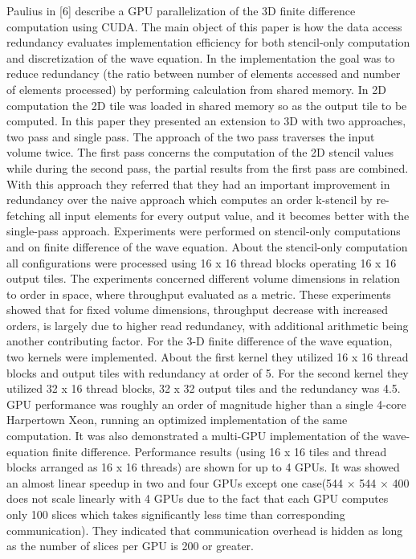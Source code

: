 Paulius in [6] describe a GPU parallelization of the 3D finite difference computation using CUDA. The main object of this paper is how the data access redundancy evaluates implementation efficiency for both stencil-only computation and discretization of the wave equation. In the implementation the goal was to reduce redundancy (the ratio between number of elements accessed and number of elements processed) by performing calculation from shared memory. In 2D computation the 2D tile was loaded in shared memory so as the output tile to be computed. In this paper they presented an extension to 3D with two approaches, two pass and single pass. The approach of the two pass traverses the input volume twice. The first pass concerns the computation of the 2D stencil values while during the second pass, the partial results from the first pass are combined. With this approach they referred that they had an important improvement in redundancy over the naive approach which computes an order k-stencil by re-fetching all input elements for every output value, and it becomes better with the single-pass approach. Experiments were performed on stencil-only computations and on finite difference of the wave equation. About the stencil-only computation all configurations were processed using 16 x 16 thread blocks operating 16 x 16 output tiles. The experiments concerned different volume dimensions in relation to order in space, where throughput evaluated as a metric. These experiments showed that for fixed volume dimensions, throughput decrease with increased orders, is largely due to higher read redundancy, with additional arithmetic being another contributing factor. For the 3-D finite difference of the wave equation, two kernels were implemented. About the first kernel they utilized 16 x 16 thread blocks and output tiles with redundancy at order of 5. For the second kernel they utilized 32 x 16 thread blocks, 32 x 32 output tiles and the redundancy was 4.5. GPU performance was roughly an order of magnitude higher than a single 4-core Harpertown Xeon, running an optimized implementation of the same computation. It was also demonstrated a multi-GPU implementation of the wave-equation finite difference. Performance results (using 16 x 16 tiles and thread blocks arranged as 16 x 16 threads) are shown for up to 4 GPUs. It was showed an almost linear speedup in two and four GPUs except one case(544 × 544 × 400 does not scale linearly with 4 GPUs due to the fact that each GPU computes only 100 slices which takes significantly less time than corresponding communication). They indicated that communication overhead is hidden as long as the number of slices per GPU is 200 or greater.

